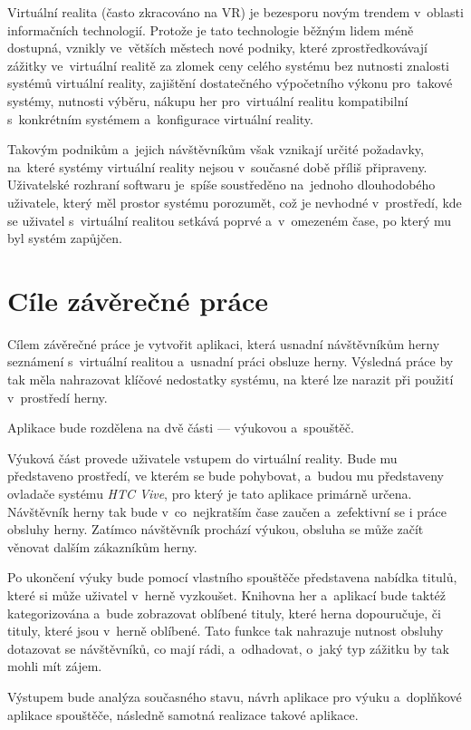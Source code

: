 \documentclass[12pt, a4paper]{article}
\begin{document}
Virtuální realita (často zkracováno na VR) je bezesporu novým trendem v~oblasti informačních technologií. Protože je tato technologie běžným lidem méně dostupná, vznikly ve~větších městech nové podniky, které zprostředkovávají zážitky ve~virtuální realitě za zlomek ceny celého systému bez nutnosti znalosti systémů virtuální reality, zajištění dostatečného výpočetního výkonu pro~takové systémy, nutnosti výběru, nákupu her pro~virtuální realitu kompatibilní s~konkrétním systémem a~konfigurace virtuální reality.\cite{herny}

Takovým podnikům a~jejich návštěvníkům však vznikají určité požadavky, na~které systémy virtuální reality nejsou v~současné době příliš připraveny. Uživatelské rozhraní softwaru je~spíše soustředěno na~jednoho dlouhodobého uživatele, který měl prostor systému porozumět, což je nevhodné v~prostředí, kde se uživatel s~virtuální realitou setkává poprvé a~v~omezeném čase, po který mu byl systém zapůjčen.

\section{Cíle závěrečné práce}

Cílem závěrečné práce je vytvořit aplikaci, která usnadní návštěvníkům herny seznámení s~virtuální realitou a~usnadní práci obsluze herny. Výsledná práce by tak měla nahrazovat klíčové nedostatky systému, na které lze narazit při použití v~prostředí herny.

Aplikace bude rozdělena na dvě části --- výukovou a~spouštěč.

Výuková část provede uživatele vstupem do virtuální reality. Bude mu představeno prostředí, ve kterém se bude pohybovat, a~budou mu představeny ovladače systému \textit{HTC Vive}, pro který je tato aplikace primárně určena. Návštěvník herny tak bude v~co~nejkratším čase zaučen a~zefektivní se i práce obsluhy herny. Zatímco návštěvník prochází výukou, obsluha se může začít věnovat dalším zákazníkům herny.

Po ukončení výuky bude pomocí vlastního spouštěče představena nabídka titulů, které si může uživatel v~herně vyzkoušet. Knihovna her a~aplikací bude taktéž kategorizována a~bude zobrazovat oblíbené tituly, které herna dopouručuje, či tituly, které jsou v~herně oblíbené. Tato funkce tak nahrazuje nutnost obsluhy dotazovat se návštěvníků, co mají rádi, a~odhadovat, o~jaký typ zážitku by tak mohli mít zájem.

Výstupem bude analýza současného stavu, návrh aplikace pro výuku a~doplňkové aplikace spouštěče, následně samotná realizace takové aplikace.
\end{document}
